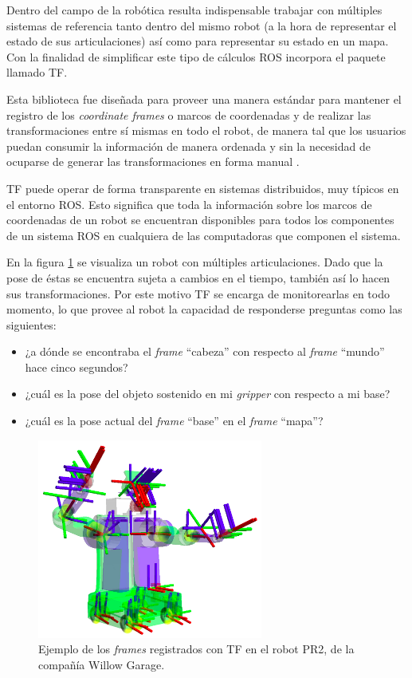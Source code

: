 Dentro del campo de la robótica resulta indispensable trabajar con múltiples sistemas de referencia tanto dentro del mismo robot (a la hora de representar el estado de sus articulaciones) así como para representar su estado en un mapa. Con la finalidad de simplificar este tipo de cálculos ROS incorpora el paquete llamado TF.

Esta biblioteca fue diseñada para proveer una manera estándar para mantener el registro de los \textit{coordinate frames} o marcos de coordenadas y de realizar las transformaciones entre sí mismas en todo el robot, de manera tal que los usuarios puedan consumir la información de manera ordenada y sin la necesidad de ocuparse de generar las transformaciones en forma manual \citep{PAPER:3}.

TF puede operar de forma transparente en sistemas distribuidos, muy típicos en el entorno ROS. Esto significa que toda la información sobre los marcos de coordenadas de un robot se encuentran disponibles para todos los componentes de un sistema ROS en cualquiera de las computadoras que componen el sistema.

En la figura \ref{fig:tf} se visualiza un robot con múltiples articulaciones. Dado que la pose de éstas se encuentra sujeta a cambios en el tiempo, también así lo hacen sus transformaciones. Por este motivo TF se encarga de monitorearlas en todo momento, lo que provee al robot la capacidad de responderse preguntas como las siguientes:

\begin{itemize}
    \item ¿a dónde se encontraba el \textit{frame} ``cabeza'' con respecto al \textit{frame} ``mundo'' hace cinco segundos?
    \item ¿cuál es la pose del objeto sostenido en mi \textit{gripper} con respecto a mi base?
    \item ¿cuál es la pose actual del \textit{frame} ``base'' en el \textit{frame} ``mapa''?
\end{itemize}


\begin{figure}[ht]
    \centering
    \includegraphics[scale=0.8]{./Figures/tf.png}
    \caption{Ejemplo de los \textit{frames} registrados con TF en el robot PR2, de la compañía Willow Garage\protect\footnotemark.}
    \label{fig:tf}
\end{figure}

